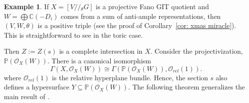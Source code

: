 \documentclass[reqno, 12pt]{amsart}
\theoremstyle{definition}
\newtheorem{example}[theorem]{Example}
\newcommand{\modmod}[1]{/ \! \! / \!_{#1}}
\numberwithin{equation}{section}
\begin{document}
\begin{example}
If $X=[V\modmod{\theta}G]$ is a projective Fano GIT quotient and $W = \bigoplus \mathbb C(-D_i)$ comes from a sum of anti-ample representations,  then $(V, W, \theta)$ is a positive triple (see the proof of Corollary~\ref{cor: xmas miracle}). This is straightforward to see in the toric case.
\end{example}

Then $Z := Z(s)$ is a complete intersection in $X$.   Consider the projectivization, $\mathbb P(\mathcal O_X(W))$. There is a canonical isomorphism 
\begin{equation} \label{eq: can iso}
\Gamma(X, \mathcal O_X(W)) \cong \Gamma(\mathbb P(\mathcal O_X(W)), \mathcal O_{rel}(1)).
\end{equation}
where
$\mathcal O_{rel}(1)$ is the relative hyperplane bundle.
Hence, the section $s$ also defines a hypersurface $Y \subseteq \mathbb P(\mathcal O_X(W))$.
The following theorem generalizes the main result of \cite{KKLL}.
\end{document}
